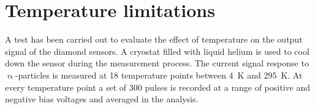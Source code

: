 








\clearpage
\section{Temperature limitations}
\label{sec:templimit}
A test has been carried out to evaluate the effect of temperature on the output signal of the diamond sensors. A cryostat filled with liquid helium is used to cool down the sensor during the measurement process. The current signal response to $\upalpha$-particles is measured at 18 temperature points between 4~K and 295~K. At every temperature point a set of 300 pulses is recorded at a range of positive and negative bias voltages and averaged in the analysis.






%


